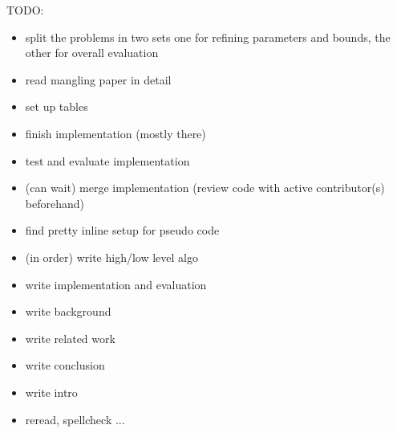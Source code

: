 \documentclass{article}
\begin{document}
TODO:
   \begin{itemize}

      \item split the problems in two sets one for refining parameters and bounds, the other for overall evaluation
      \item read mangling paper in detail
      \item set up tables
      \item finish implementation (mostly there)
      \item test and evaluate implementation 
      \item (can wait) merge implementation (review code with active contributor(s) beforehand)
      \item find pretty inline setup for pseudo code
      \item (in order) write high/low level algo
      \item write implementation and evaluation
      \item write background
      \item write related work
      \item write conclusion
      \item write intro
      \item reread, spellcheck ...
    \end{itemize}

\end{document}
